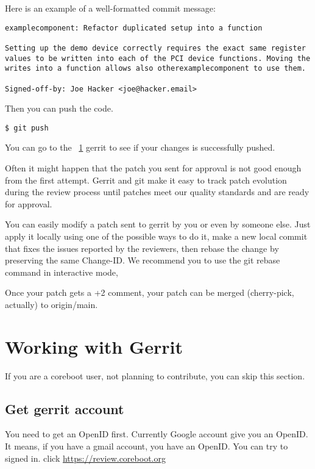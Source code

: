 \documentclass[titlepage,12pt]{article}
\begin{document}
{Here is an example of a well-formatted commit message:

{ \small
\begin{verbatim}
examplecomponent: Refactor duplicated setup into a function

Setting up the demo device correctly requires the exact same register
values to be written into each of the PCI device functions. Moving the
writes into a function allows also otherexamplecomponent to use them.

Signed-off-by: Joe Hacker <joe@hacker.email>
\end{verbatim}
}

Then you can push the code.
{ \small
\begin{verbatim}
$ git push
\end{verbatim}
}

You can go to the ~\ref{sec:gerrit} gerrit to see if your changes is successfully pushed.

Often it might happen that the patch you sent for approval is not good
enough from the first attempt. Gerrit and git make it easy to track
patch evolution during the review process until patches meet our
quality standards and are ready for approval.

You can easily modify a patch sent to gerrit by you or even by someone
else. Just apply it locally using one of the possible ways to do it,
make a new local commit that fixes the issues reported by the
reviewers, then rebase the change by preserving the same Change-ID. We
recommend you to use the git rebase command in interactive mode,

Once your patch gets a +2 comment, your patch can be merged (cherry-pick, actually) to origin/main.

%
%

\section{Working with Gerrit}
\label{sec:gerrit}
If you are a coreboot user, not planning to contribute, you can skip this section.
\subsection{Get gerrit account}
You need to get an OpenID first. Currently Google account give you an OpenID. It means, if you have a gmail account, you have an OpenID. You can try to signed in.
click \url{https://review.coreboot.org}

}
\end{document}
